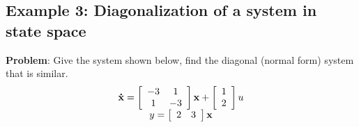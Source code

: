 \subsection*{Example 3: Diagonalization of a system in state space} %
\label{ssub:example_2}

\textbf{Problem}: Give the system shown below, find the diagonal (normal form) system that is similar.
\[
\begin{array}{c}
 {\bf{\dot x}} = \left[ {\begin{array}{*{20}c}
   { - 3} & 1  \\
   1 & { - 3}  \\
\end{array}} \right]{\bf{x}} + \left[ {\begin{array}{*{20}c}
   1  \\
   2  \\
\end{array}} \right]u \\ 
 y = \left[ {\begin{array}{*{20}c}
   2 & 3  \\
\end{array}} \right]{\bf{x}} \\ 
 \end{array}
\]

